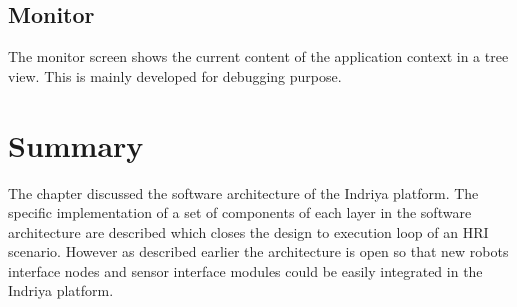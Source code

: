 \subsection*{Monitor}
The monitor screen shows the current content of the application context in a tree view. This is mainly developed for debugging purpose.
\section{Summary}
The chapter discussed the software architecture of the Indriya platform. The specific implementation of a set of components of each layer in the software architecture are described which closes the design to execution loop of an HRI scenario. However as described earlier the architecture is open so that new robots interface nodes and sensor interface modules could be easily integrated in the Indriya platform.
